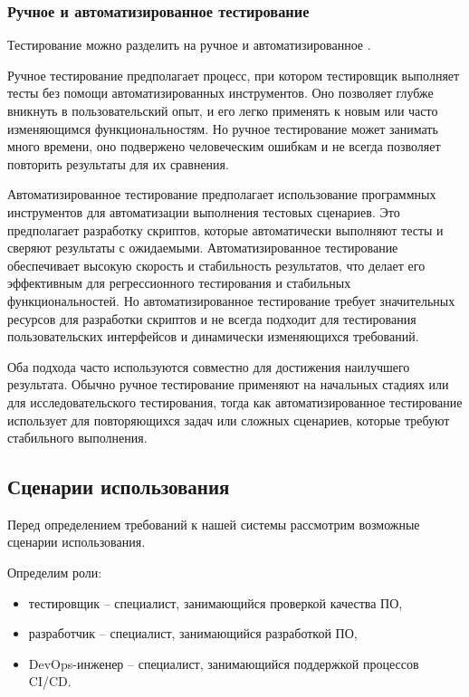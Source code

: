 \subsubsection{Ручное и автоматизированное тестирование}

Тестирование можно разделить на ручное и автоматизированное \cite{testing-classes}.

Ручное тестирование предполагает процесс, при котором тестировщик выполняет тесты без помощи автоматизированных инструментов.
Оно позволяет глубже вникнуть в пользовательский опыт, и его легко применять к новым или часто изменяющимся функциональностям. Но ручное тестирование может занимать много времени, оно подвержено человеческим ошибкам и не всегда позволяет повторить результаты для их сравнения.

Автоматизированное тестирование предполагает использование программных инструментов для автоматизации выполнения тестовых сценариев. Это предполагает разработку скриптов, которые автоматически выполняют тесты и сверяют результаты с ожидаемыми.
Автоматизированное тестирование обеспечивает высокую скорость и стабильность результатов, что делает его эффективным для регрессионного тестирования и стабильных функциональностей. Но автоматизированное тестирование требует значительных ресурсов для разработки скриптов и не всегда подходит для тестирования пользовательских интерфейсов и динамически изменяющихся требований.

Оба подхода часто используются совместно для достижения наилучшего результата. Обычно ручное тестирование применяют на начальных стадиях или для исследовательского тестирования, тогда как автоматизированное тестирование использует для повторяющихся задач или сложных сценариев, которые требуют стабильного выполнения.

\subsection{Сценарии использования}

Перед определением требований к нашей системы рассмотрим возможные сценарии использования.

Определим роли:

\begin{itemize}
    \item тестировщик -- специалист, занимающийся проверкой качества ПО,
    \item разработчик -- специалист, занимающийся разработкой ПО,
    \item DevOps-инженер -- специалист, занимающийся поддержкой процессов CI/CD.
\end{itemize}

